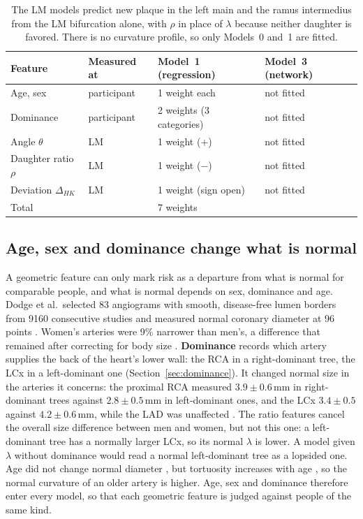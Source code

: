 \begin{table}[tbp]
  \vspace{1.5em}
  \caption{The LM models predict new plaque in the left main and the ramus intermedius from the LM bifurcation alone, with $\rho$ in place of $\lambda$ because neither daughter is favored.
    There is no curvature profile, so only Models~0 and~1 are fitted.}
  \label{tab:risk-lm}
  \begin{tabular}{@{}p{3.3cm}p{1.9cm}p{4.0cm}p{5.0cm}@{}}
    \toprule
    Feature & Measured at & Model~1 (regression) & Model~3 (network) \\
    \midrule
    Age, sex & participant & 1 weight each & not fitted \\
    Dominance & participant & 2 weights (3 categories) & not fitted \\
    Angle $\theta$ & LM & 1 weight ($+$) & not fitted \\
    Daughter ratio $\rho$ & LM & 1 weight ($-$) & not fitted \\
    Deviation $\Delta_{HK}$ & LM & 1 weight (sign open) & not fitted \\
    \midrule
    Total & & 7 weights & \\
    \bottomrule
  \end{tabular}
\end{table}

\subsection{Age, sex and dominance change what is normal}

A geometric feature can only mark risk as a departure from what is normal for comparable people, and what is normal depends on sex, dominance and age.
Dodge et al.\ selected 83 angiograms with smooth, disease-free lumen borders from 9160 consecutive studies and measured normal coronary diameter at 96 points \cite{dodge1992diameter}.
Women's arteries were 9\% narrower than men's, a difference that remained after correcting for body size \cite{dodge1992diameter}.
\textbf{Dominance} records which artery supplies the back of the heart's lower wall: the RCA in a right-dominant tree, the LCx in a left-dominant one (Section~\ref{sec:dominance}).
It changed normal size in the arteries it concerns: the proximal RCA measured $3.9 \pm 0.6$\,mm in right-dominant trees against $2.8 \pm 0.5$\,mm in left-dominant ones, and the LCx $3.4 \pm 0.5$ against $4.2 \pm 0.6$\,mm, while the LAD was unaffected \cite{dodge1992diameter}.
The ratio features cancel the overall size difference between men and women, but not this one: a left-dominant tree has a normally larger LCx, so its normal $\lambda$ is lower.
A model given $\lambda$ without dominance would read a normal left-dominant tree as a lopsided one.
Age did not change normal diameter \cite{dodge1992diameter}, but tortuosity increases with age \cite{kahe2020tortuosity}, so the normal curvature of an older artery is higher.
Age, sex and dominance therefore enter every model, so that each geometric feature is judged against people of the same kind.


